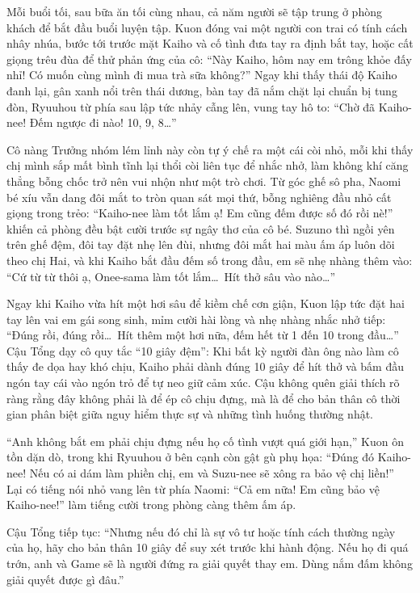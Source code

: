 \documentclass[../main.tex]{subfiles}
\begin{document}
Mỗi buổi tối, sau bữa ăn tối cùng nhau, cả năm người sẽ tập trung ở phòng khách để bắt đầu buổi luyện tập. Kuon đóng vai một người con trai có tính cách nhây nhúa, bước tới trước mặt Kaiho và cố tình đưa tay ra định bắt tay, hoặc cất giọng trêu đùa để thử phản ứng của cô: ``Này Kaiho, hôm nay em trông khỏe đấy nhỉ! Có muốn cùng mình đi mua trà sữa không?'' Ngay khi thấy thái độ Kaiho đanh lại, gân xanh nổi trên thái dương, bàn tay đã nắm chặt lại chuẩn bị tung đòn, Ryuuhou từ phía sau lập tức nhảy cẫng lên, vung tay hô to: ``Chờ đã Kaiho-nee! Đếm ngược đi nào! 10, 9, 8\dots''

Cô nàng Trưởng nhóm lém lỉnh này còn tự ý chế ra một cái còi nhỏ, mỗi khi thấy chị mình sắp mất bình tĩnh lại thổi còi liên tục để nhắc nhở, làm không khí căng thẳng bỗng chốc trở nên vui nhộn như một trò chơi. Từ góc ghế sô pha, Naomi bé xíu vẫn dang đôi mắt to tròn quan sát mọi thứ, bỗng nghiêng đầu nhỏ cất giọng trong trẻo: ``Kaiho-nee làm tốt lắm ạ! Em cũng đếm được số đó rồi nè!'' khiến cả phòng đều bật cười trước sự ngây thơ của cô bé. Suzuno thì ngồi yên trên ghế đệm, đôi tay đặt nhẹ lên đùi, nhưng đôi mắt hai màu ấm áp luôn dõi theo chị Hai, và khi Kaiho bắt đầu đếm số trong đầu, em sẽ nhẹ nhàng thêm vào: ``Cứ từ từ thôi ạ, Onee-sama làm tốt lắm\dots\ Hít thở sâu vào nào\dots''

Ngay khi Kaiho vừa hít một hơi sâu để kiềm chế cơn giận, Kuon lập tức đặt hai tay lên vai em gái song sinh, mỉm cười hài lòng và nhẹ nhàng nhắc nhở tiếp: ``Đúng rồi, đúng rồi\dots\ Hít thêm một hơi nữa, đếm hết từ 1 đến 10 trong đầu\dots'' Cậu Tổng dạy cô quy tắc ``10 giây đệm'': Khi bất kỳ người đàn ông nào làm cô thấy đe dọa hay khó chịu, Kaiho phải dành đúng 10 giây để hít thở và bấm đầu ngón tay cái vào ngón trỏ để tự neo giữ cảm xúc. Cậu không quên giải thích rõ ràng rằng đây không phải là để ép cô chịu đựng, mà là để cho bản thân cô thời gian phân biệt giữa nguy hiểm thực sự và những tình huống thường nhật.

``Anh không bắt em phải chịu đựng nếu họ cố tình vượt quá giới hạn,'' Kuon ôn tồn dặn dò, trong khi Ryuuhou ở bên cạnh còn gật gù phụ họa: ``Đúng đó Kaiho-nee! Nếu có ai dám làm phiền chị, em và Suzu-nee sẽ xông ra bảo vệ chị liền!'' Lại có tiếng nói nhỏ vang lên từ phía Naomi: ``Cả em nữa! Em cũng bảo vệ Kaiho-nee!'' làm tiếng cười trong phòng càng thêm ấm áp.

Cậu Tổng tiếp tục: ``Nhưng nếu đó chỉ là sự vô tư hoặc tính cách thường ngày của họ, hãy cho bản thân 10 giây để suy xét trước khi hành động. Nếu họ đi quá trớn, anh và Game sẽ là người đứng ra giải quyết thay em. Dùng nắm đấm không giải quyết được gì đâu.''
\end{document}

